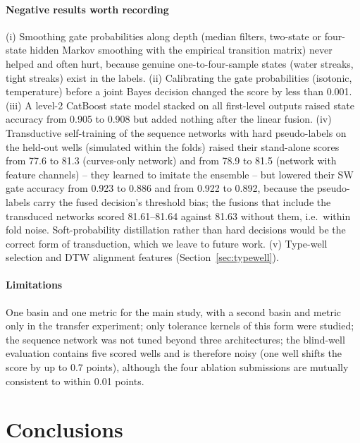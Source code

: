 \documentclass[preprint,12pt]{elsarticle}
\begin{document}
\paragraph{Negative results worth recording} (i) Smoothing gate probabilities along depth (median filters, two-state or four-state hidden Markov smoothing with the empirical transition matrix) never helped and often hurt, because genuine one-to-four-sample states (water streaks, tight streaks) exist in the labels. (ii) Calibrating the gate probabilities (isotonic, temperature) before a joint Bayes decision changed the score by less than 0.001. (iii) A level-2 CatBoost state model stacked on all first-level outputs raised state accuracy from 0.905 to 0.908 but added nothing after the linear fusion. (iv) Transductive self-training of the sequence networks with hard pseudo-labels on the held-out wells (simulated within the folds) raised their stand-alone scores from 77.6 to 81.3 (curves-only network) and from 78.9 to 81.5 (network with feature channels) -- they learned to imitate the ensemble -- but lowered their SW gate accuracy from 0.923 to 0.886 and from 0.922 to 0.892, because the pseudo-labels carry the fused decision's threshold bias; the fusions that include the transduced networks scored 81.61--81.64 against 81.63 without them, i.e.\ within fold noise. Soft-probability distillation rather than hard decisions would be the correct form of transduction, which we leave to future work. (v) Type-well selection and DTW alignment features (Section~\ref{sec:typewell}).

\paragraph{Limitations} One basin and one metric for the main study, with a second basin and metric only in the transfer experiment; only tolerance kernels of this form were studied; the sequence network was not tuned beyond three architectures; the blind-well evaluation contains five scored wells and is therefore noisy (one well shifts the score by up to 0.7 points), although the four ablation submissions are mutually consistent to within 0.01 points.

\section{Conclusions}
\label{sec:conclusions}
\end{document}
